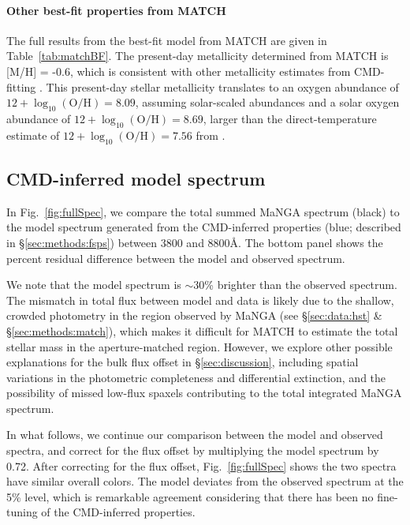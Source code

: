 \documentclass[preprint2]{aastex62}
\newcommand\Msun{\ensuremath{\,\mathrm{M_{\sun}}}\xspace}
\newcommand{\ang}{\ensuremath{\mbox{\AA}}\xspace}
\begin{document}
\paragraph{Other best-fit properties from MATCH}

The full results from the best-fit model from MATCH are given in Table~\ref{tab:matchBF}. The present-day metallicity determined from MATCH is [M/H] = -0.6, which is consistent with other metallicity estimates from CMD-fitting \citep[e.g.,][]{Rosenfield+2016}. This present-day stellar metallicity translates to an oxygen abundance of $12+\log_{10}(\mathrm{O}/\mathrm{H}) = 8.09$, assuming solar-scaled abundances and a solar oxygen abundance of $12+\log_{10}(\mathrm{O}/\mathrm{H}) = 8.69$, larger than the direct-temperature estimate of $12+\log_{10}(\mathrm{O}/\mathrm{H}) = 7.56$ from \citet{Berg+2012}.



\subsection{CMD-inferred model spectrum}\label{sec:results:fsps}

In Fig.~\ref{fig:fullSpec}, we compare the total summed MaNGA spectrum (black) to the model spectrum generated from the CMD-inferred properties (blue; described in \S\ref{sec:methods:fsps}) between 3800 and 8800\ang. The bottom panel shows the percent residual difference between the model and observed spectrum. 

We note that the model spectrum is $\sim30$\% brighter than the observed spectrum. The mismatch in total flux between model and data is likely due to the shallow, crowded photometry in the region observed by MaNGA (see \S\ref{sec:data:hst} \& \S\ref{sec:methods:match}), which makes it difficult for MATCH to estimate the total stellar mass in the aperture-matched region. However, we explore other possible explanations for the bulk flux offset in \S\ref{sec:discussion}, including spatial variations in the photometric completeness and differential extinction, and the possibility of missed low-flux spaxels contributing to the total integrated MaNGA spectrum.

In what follows, we continue our comparison between the model and observed spectra, and correct for the flux offset by multiplying the model spectrum by 0.72. After correcting for the flux offset, Fig.~\ref{fig:fullSpec} shows the two spectra have similar overall colors. The model deviates from the observed spectrum at the 5\% level, which is remarkable agreement considering that there has been no fine-tuning of the CMD-inferred properties.
\end{document}

